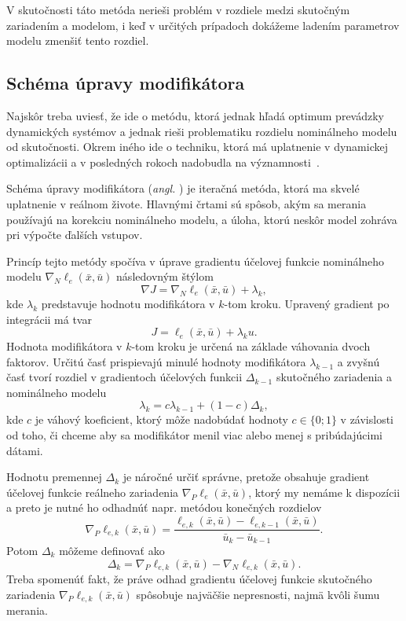 V skutočnosti táto metóda nerieši problém v rozdiele medzi skutočným zariadením a modelom, i keď v určitých prípadoch dokážeme ladením parametrov modelu zmenšiť tento rozdiel.

\subsection{Schéma úpravy modifikátora}
Najskôr treba uviesť, že ide o metódu, ktorá jednak hľadá optimum prevádzky dynamických systémov a jednak rieši problematiku rozdielu nominálneho modelu od skutočnosti. Okrem iného ide o techniku, ktorá má uplatnenie v dynamickej optimalizácii a v posledných rokoch nadobudla na významnosti~\cite{marchetti:modifier_adapt_scheme:2020}.

Schéma úpravy modifikátora (\textit{angl. }) je iteračná metóda, ktorá ma skvelé uplatnenie v reálnom živote. Hlavnými črtami sú spôsob, akým sa merania používajú na korekciu nominálneho modelu, a úloha, ktorú neskôr model zohráva pri výpočte ďalších vstupov.

Princíp tejto metódy spočíva v úprave gradientu účelovej funkcie nominálneho modelu $ \nabla_N\ell_e(\bar{x},\bar{u}) $ následovným štýlom
\begin{equation}
	\nabla J = \nabla_N\ell_e(\bar{x},\bar{u}) + \lambda_k,
\end{equation}
kde $ \lambda_k $ predstavuje hodnotu modifikátora v $ k $-tom kroku. Upravený gradient po integrácii má tvar 
\begin{equation}
	J = \ell_e(\bar{x},\bar{u}) + \lambda_ku.
\end{equation}
Hodnota modifikátora v $ k $-tom kroku je určená na základe váhovania dvoch faktorov. Určitú časť prispievajú minulé hodnoty modifikátora $ \lambda_{k-1} $ a zvyšnú časť tvorí rozdiel v gradientoch účelových funkcii $ \Delta_{k-1} $ skutočného zariadenia a nominálneho modelu 
\begin{equation}
	\label{eq:mas_weight}
	\lambda_k = c\lambda_{k-1} + \left(1 - c\right)\Delta_{k},
\end{equation}
kde $ c $ je váhový koeficient, ktorý môže nadobúdať hodnoty $ c \in \lbrace 0; 1 \rbrace $ v závislosti od toho, či chceme aby sa modifikátor menil viac alebo menej s pribúdajúcimi dátami.

Hodnotu premennej $ \Delta_k $ je náročné určiť správne, pretože obsahuje gradient účelovej funkcie reálneho zariadenia $ \nabla_P\ell_e(\bar{x},\bar{u}) $, ktorý my nemáme k dispozícii a preto je nutné ho odhadnúť napr. metódou konečných rozdielov
\begin{equation}
	\nabla_P\ell_{e,k}(\bar{x},\bar{u}) = \frac{\ell_{e,k}(\bar{x},\bar{u}) - \ell_{e,k-1}(\bar{x},\bar{u})}{\bar{u}_k - \bar{u}_{k-1}}.
\end{equation} 
Potom $ \Delta_k $ môžeme definovať ako 
\begin{equation}
	\label{eq:mas_correction}
	\Delta_k = \nabla_P\ell_{e,k}(\bar{x},\bar{u}) - \nabla_N\ell_{e,k}(\bar{x},\bar{u}).
\end{equation}
Treba spomenúť fakt, že práve odhad gradientu účelovej funkcie skutočného zariadenia $ \nabla_P\ell_{e,k}(\bar{x},\bar{u}) $ spôsobuje najväčšie nepresnosti, najmä kvôli šumu merania. 

